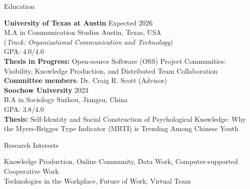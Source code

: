 \documentclass[
	11pt, %
]{resume} %
\begin{document}

\begin{rSection}{Education}
	
	\textbf{University of Texas at Austin} \hfill Expected 2026\\
	M.A in Communication Studies \hfill Austin, Texas, USA \\
	(\textit{Track: Organizational Communication and Technology}) \smallskip \\
	GPA: 4.0/4.0\\
    \textbf{Thesis in Progress:} Open-source Software (OSS) Project Communities: Visibility, Knowledge Production, and Distributed Team Collaboration\\
    \textbf{Committee members}: Dr. Craig R. Scott (Advisor)\\

    \textbf{Soochow University} \hfill 2023 \\ 
	B.A in Sociology \hfill Suzhou, Jiangsu, China \\
	GPA: 3.8/4.0\\
    \textbf{Thesis:} Self-Identity and Social Construction of Psychological Knowledge: Why the Myers-Brigges Type Indicator (MBTI) is Trending Among Chinese Youth\\
	
\end{rSection}

\begin{rSection}{Research Interests}

Knowledge Production, Online Community, Data Work, Computer-supported Cooperative Work\\
Technologies in the Workplace, Future of Work, Virtual Team\\

\end{rSection}

\end{document}
